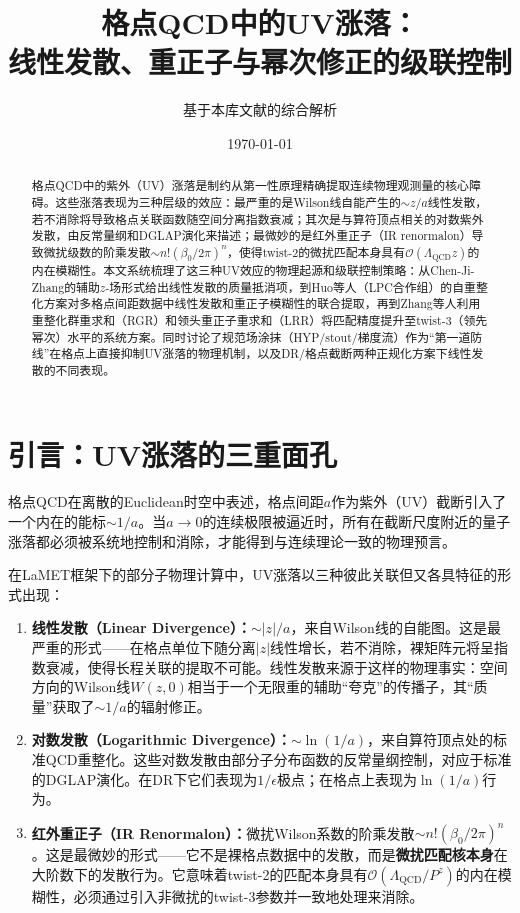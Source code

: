 \documentclass[12pt,a4paper]{ctexart}
\title{\heiti 格点QCD中的UV涨落：\\
线性发散、重正子与幂次修正的级联控制}
\author{基于本库文献的综合解析}
\date{\today}
\theoremstyle{definition}
\begin{document}
\maketitle

\begin{abstract}
\noindent
格点QCD中的紫外（UV）涨落是制约从第一性原理精确提取连续物理观测量的核心障碍。这些涨落表现为三种层级的效应：最严重的是Wilson线自能产生的$\sim z/a$线性发散，若不消除将导致格点关联函数随空间分离指数衰减；其次是与算符顶点相关的对数紫外发散，由反常量纲和DGLAP演化来描述；最微妙的是红外重正子（IR renormalon）导致微扰级数的阶乘发散$\sim n!(\beta_0/2\pi)^n$，使得twist-2的微扰匹配本身具有$\mathcal{O}(\Lambda_{\text{QCD}}z)$的内在模糊性。本文系统梳理了这三种UV效应的物理起源和级联控制策略：从Chen-Ji-Zhang的辅助$z$-场形式给出线性发散的质量抵消项，到Huo等人（LPC合作组）的自重整化方案对多格点间距数据中线性发散和重正子模糊性的联合提取，再到Zhang等人利用重整化群重求和（RGR）和领头重正子重求和（LRR）将匹配精度提升至twist-3（领先幂次）水平的系统方案。同时讨论了规范场涂抹（HYP/stout/梯度流）作为``第一道防线''在格点上直接抑制UV涨落的物理机制，以及DR/格点截断两种正规化方案下线性发散的不同表现。
\end{abstract}

\tableofcontents
\newpage

\section{引言：UV涨落的三重面孔}

格点QCD在离散的Euclidean时空中表述，格点间距$a$作为紫外（UV）截断引入了一个内在的能标$\sim 1/a$。当$a \to 0$的连续极限被逼近时，所有在截断尺度附近的量子涨落都必须被系统地控制和消除，才能得到与连续理论一致的物理预言。

在LaMET框架下的部分子物理计算中，UV涨落以三种彼此关联但又各具特征的形式出现\cite{Chen2016improved,Huo2021self,Zhang2023RGR,Su2023LRR}：

\begin{enumerate}
    \item \textbf{线性发散（Linear Divergence）：}$\sim |z|/a$，来自Wilson线的自能图。这是最严重的形式——在格点单位下随分离$|z|$线性增长，若不消除，裸矩阵元将呈指数衰减，使得长程关联的提取不可能。线性发散来源于这样的物理事实：空间方向的Wilson线$W(z,0)$相当于一个无限重的辅助``夸克''的传播子，其``质量''获取了$\sim 1/a$的辐射修正。

    \item \textbf{对数发散（Logarithmic Divergence）：}$\sim \ln(1/a)$，来自算符顶点处的标准QCD重整化。这些对数发散由部分子分布函数的反常量纲控制，对应于标准的DGLAP演化。在DR下它们表现为$1/\epsilon$极点；在格点上表现为$\ln(1/a)$行为。

    \item \textbf{红外重正子（IR Renormalon）：}微扰Wilson系数的阶乘发散$\sim n!(\beta_0/2\pi)^n$。这是最微妙的形式——它不是裸格点数据中的发散，而是\textbf{微扰匹配核本身}在大阶数下的发散行为。它意味着twist-2的匹配本身具有$\mathcal{O}(\Lambda_{\text{QCD}}/P^z)$的内在模糊性，必须通过引入非微扰的twist-3参数并一致地处理来消除。
\end{enumerate}
\end{document}
